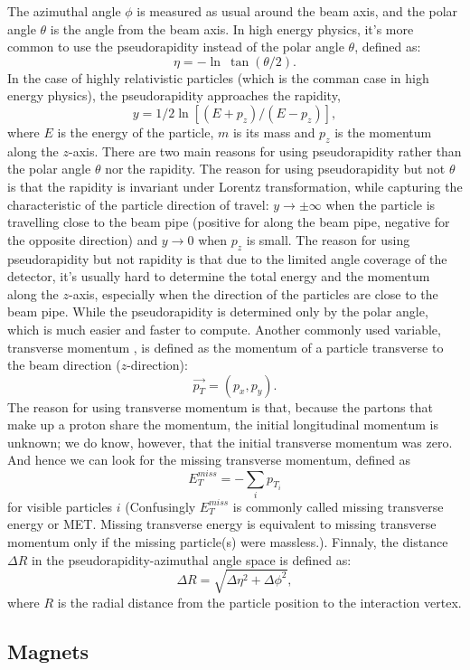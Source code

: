 The azimuthal angle $\phi$ 	is measured as usual around the beam axis, 
and the polar angle $\theta$ is the angle from the beam axis.  
In high energy physics, it's more common to use the 
pseudorapidity instead of the polar angle $\theta$, defined as:
\[
		\eta = -\ln\ \tan(\theta/2). 
\]
In the case of highly relativistic particles
(which is the comman case in high energy physics), 
the pseudorapidity approaches the rapidity, 
\[ 
	y=1/2\ln[(E+p_z)/(E-p_z)], 
\]
where $E$ is the energy of the particle, $m$ is its mass 
and $p_z$ is the momentum along the $z$-axis.
There are two main reasons for using pseudorapidity 
rather than the polar angle $\theta$ nor the rapidity.
The reason for using pseudorapidity but not $\theta$ 
is that the rapidity is invariant
under Lorentz transformation, while capturing 
the characteristic of the particle direction of travel:
$y \rightarrow \pm \infty $ when the particle is  
travelling close to the beam pipe (positive for along the
beam pipe, negative for the opposite direction) and
$y \rightarrow 0$ when $p_z$ is small.
The reason for using pseudorapidity but not rapidity
is that due to the limited angle coverage of the detector, 
it's usually hard to determine the total energy and the momentum 
along the $z$-axis, especially when the direction of 
the particles are close to the beam pipe. 
While the pseudorapidity is determined only by
the polar angle, which is much easier and faster 
to compute. 
Another commonly used variable, transverse momentum \pt, 
is defined as the momentum of a particle transverse to the 
beam direction ($z$-direction):
\[ 
	\vec{p_T}= (p_x,p_y).
\]
The reason for using transverse momentum 
is that, because the partons that make up a proton share the momentum,
the initial longitudinal momentum is unknown;	
we do know, however, that the initial transverse momentum was zero. 
And hence we can look for the missing transverse momentum, defined
as 
\[ 
	E_T^{miss}=-\sum_i p_{T_i}  
\]
for visible particles $i$ (Confusingly $E_T^{miss}$ is commonly called 
missing transverse energy or MET. Missing transverse energy is equivalent 
to missing transverse momentum only if the missing particle(s) were massless.). 
Finnaly, the distance $\Delta R$ in the pseudorapidity-azimuthal angle 
space is defined as:
\[\Delta R = \sqrt{\Delta \eta^2+\Delta\phi^2},\]
where $R$ is the radial distance from the particle position to the interaction 
vertex.

\subsection{Magnets}


